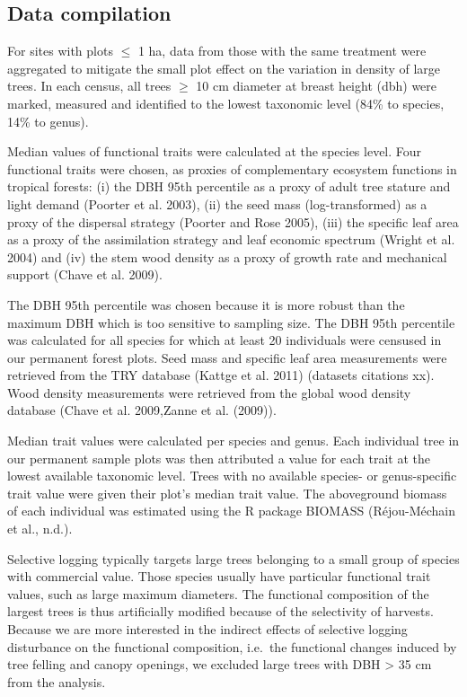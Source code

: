 \documentclass[]{elsarticle} %
\begin{document}
\subsection{Data compilation}\label{data-compilation}

For sites with plots \(\leq\) 1 ha, data from those with the same
treatment were aggregated to mitigate the small plot effect on the
variation in density of large trees. In each census, all trees \(\geq\)
10 cm diameter at breast height (dbh) were marked, measured and
identified to the lowest taxonomic level (84\% to species, 14\% to
genus).

Median values of functional traits were calculated at the species level.
Four functional traits were chosen, as proxies of complementary
ecosystem functions in tropical forests: (i) the DBH 95th percentile as
a proxy of adult tree stature and light demand (Poorter et al. 2003),
(ii) the seed mass (log-transformed) as a proxy of the dispersal
strategy (Poorter and Rose 2005), (iii) the specific leaf area as a
proxy of the assimilation strategy and leaf economic spectrum (Wright et
al. 2004) and (iv) the stem wood density as a proxy of growth rate and
mechanical support (Chave et al. 2009).

The DBH 95th percentile was chosen because it is more robust than the
maximum DBH which is too sensitive to sampling size. The DBH 95th
percentile was calculated for all species for which at least 20
individuals were censused in our permanent forest plots. Seed mass and
specific leaf area measurements were retrieved from the TRY database
(Kattge et al. 2011) (datasets citations xx). Wood density measurements
were retrieved from the global wood density database (Chave et al.
2009,Zanne et al. (2009)).

Median trait values were calculated per species and genus. Each
individual tree in our permanent sample plots was then attributed a
value for each trait at the lowest available taxonomic level. Trees with
no available species- or genus-specific trait value were given their
plot's median trait value. The aboveground biomass of each individual
was estimated using the R package BIOMASS (Réjou-Méchain et al., n.d.).

Selective logging typically targets large trees belonging to a small
group of species with commercial value. Those species usually have
particular functional trait values, such as large maximum diameters. The
functional composition of the largest trees is thus artificially
modified because of the selectivity of harvests. Because we are more
interested in the indirect effects of selective logging disturbance on
the functional composition, i.e.~the functional changes induced by tree
felling and canopy openings, we excluded large trees with DBH
\textgreater{} 35 cm from the analysis.
\end{document}

